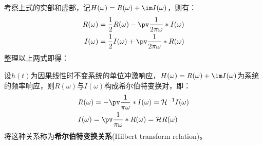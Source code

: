考察上式的实部和虚部，记$H(\omega)=R(\omega)+\im I(\omega)$，则有：
\begin{align*}
    R(\omega)&=\frac{1}{2}R(\omega)-\pv\frac{1}{2\pi \omega}*I(\omega)\\
    I(\omega)&=\frac{1}{2}I(\omega)+\pv\frac{1}{2\pi \omega}*R(\omega)
\end{align*}
整理以上两式即得：
\begin{theorem}[希尔伯特变换关系]
    设$h(t)$为因果线性时不变系统的单位冲激响应，$H(\omega)=R(\omega)+\im I(\omega)$为系统的频率响应，则$R(\omega)$与$I(\omega)$构成希尔伯特变换对，即：
    \begin{align*}
    &R(\omega)=-\pv\frac{1}{\pi \omega}*I(\omega)=\mathcal{H} ^{-1}I(\omega)\\
    &I(\omega)=\pv\frac{1}{\pi \omega}*R(\omega)=\mathcal{H} R(\omega)
\end{align*}
将这种关系称为\textbf{希尔伯特变换关系}(Hilbert transform relation)。
\end{theorem}
